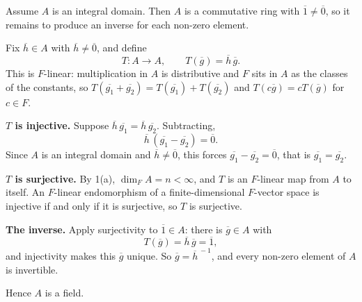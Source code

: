 \documentclass[11pt]{article}
\begin{document}
\begin{solution}
  Assume $A$ is an integral domain. Then $A$ is a commutative ring with
  $\overline{1} \neq \overline{0}$, so it remains to produce an inverse for each
  non-zero element.

  Fix $\overline{h} \in A$ with $\overline{h} \neq \overline{0}$, and define
  \[
    T \colon A \longrightarrow A, \qquad
    T(\overline{g}) = \overline{h}\,\overline{g} .
  \]
  This is $F$-linear: multiplication in $A$ is distributive and $F$ sits in $A$
  as the classes of the constants, so
  $T(\overline{g_1} + \overline{g_2}) = T(\overline{g_1}) + T(\overline{g_2})$
  and $T(c\overline{g}) = cT(\overline{g})$ for $c \in F$.

  \textbf{$T$ is injective.} Suppose
  $\overline{h}\,\overline{g_1} = \overline{h}\,\overline{g_2}$. Subtracting,
  \[
    \overline{h}\,(\overline{g_1} - \overline{g_2}) = \overline{0} .
  \]
  Since $A$ is an integral domain and $\overline{h} \neq \overline{0}$, this
  forces $\overline{g_1} - \overline{g_2} = \overline{0}$, that is
  $\overline{g_1} = \overline{g_2}$.

  \textbf{$T$ is surjective.} By 1(a), $\dim_F A = n < \infty$, and $T$ is an
  $F$-linear map from $A$ to itself. An $F$-linear endomorphism of a
  finite-dimensional $F$-vector space is injective if and only if it is
  surjective, so $T$ is surjective.

  \textbf{The inverse.} Apply surjectivity to $\overline{1} \in A$: there is
  $\overline{g} \in A$ with
  \[
    T(\overline{g}) = \overline{h}\,\overline{g} = \overline{1} ,
  \]
  and injectivity makes this $\overline{g}$ unique. So $\overline{g} =
  \overline{h}^{\,-1}$, and every non-zero element of $A$ is invertible.

  Hence $A$ is a field.
\end{solution}
\end{document}

